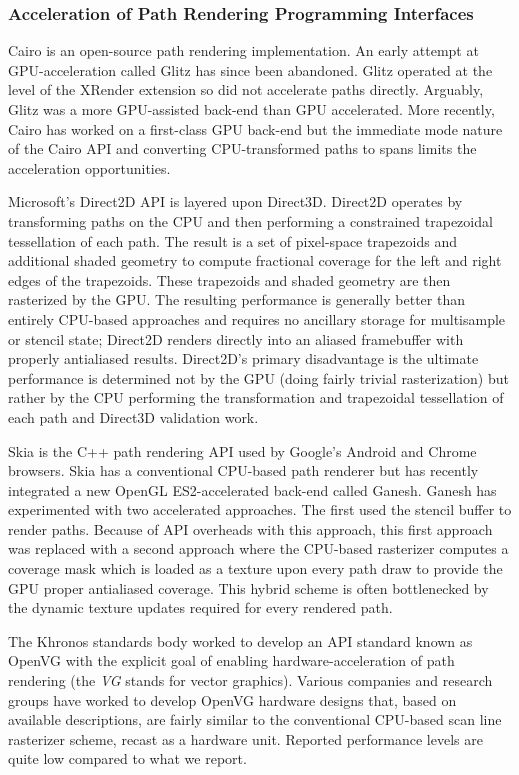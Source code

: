 \subsubsection{Acceleration of Path Rendering Programming Interfaces}

Cairo \cite{Rejected} is an open-source path rendering implementation.
An early attempt at GPU-acceleration called Glitz \cite{Glitz} has
since been abandoned.  Glitz operated at the level of the XRender
\cite{Packard:2001:DIX:647054.715760} extension so did not accelerate
paths directly.  Arguably, Glitz was a more GPU-assisted back-end than
GPU accelerated. 
More recently, Cairo has worked on a first-class GPU back-end but the
immediate mode nature of the Cairo API and converting CPU-transformed
paths to spans limits the acceleration opportunities.  

Microsoft's Direct2D \cite{Direct2D} API is layered upon Direct3D.
Direct2D operates by transforming paths on the CPU and then performing
a constrained trapezoidal tessellation of each path.  The result is a
set of pixel-space trapezoids and additional shaded geometry to compute
fractional coverage for the left and right edges of the trapezoids.
These trapezoids and shaded geometry are then rasterized by the GPU.
The resulting performance is generally better than entirely CPU-based
approaches and requires no ancillary storage for multisample or stencil
state; Direct2D renders directly into an aliased framebuffer with
properly antialiased results.  Direct2D's primary disadvantage is the
ultimate performance is determined not by the GPU (doing fairly trivial
rasterization) but rather by the CPU performing the transformation and
trapezoidal tessellation of each path and Direct3D validation work.

Skia is the C++ path rendering API used by Google's Android and Chrome
browsers.  Skia has a conventional CPU-based path renderer but has
recently integrated a new OpenGL ES2-accelerated back-end called Ganesh.
Ganesh has experimented with two accelerated approaches.  The first
used the stencil buffer to render paths.  Because of API overheads
with this approach, this first approach was replaced with a second
approach where the CPU-based rasterizer computes a coverage mask which
is loaded as a texture upon every path draw to provide the GPU proper
antialiased coverage.  This hybrid scheme is often bottlenecked by the
dynamic texture updates required for every rendered path.

The Khronos standards body worked to develop an API standard known
as OpenVG with the explicit goal of enabling hardware-acceleration of
path rendering (the {\em VG} stands for vector graphics).
Various companies and research groups have worked to develop OpenVG
hardware designs \cite{iMX35,Huang:2006:IOR:1169227.1169771,4637621} that,
based on available descriptions, are fairly similar to the conventional
CPU-based scan line rasterizer scheme, recast as a hardware unit.
Reported performance levels are quite low compared to what we report.

